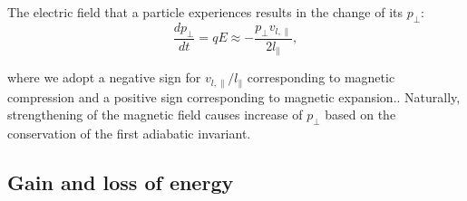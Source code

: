 \documentclass[preprint2,twocolumn,times,tighten]{aastex63}
\begin{document}
The electric field that a {particle} experiences results in the change of its $p_\perp$:
\begin{equation}
 \frac{dp_\bot}{dt} =q E \approx -\frac{p_\bot v_{l,\|}}{2l_{\|}},
\label{pper}
\end{equation}
{where we 
adopt 
{a negative sign for $v_{l,\|}/l_\|$ corresponding to magnetic compression 
and a positive sign corresponding to magnetic expansion.}. 
Naturally, strengthening of the magnetic field causes increase of $p_\perp$ based on the conservation of the first adiabatic invariant. 


\subsection{Gain and loss of energy} 





}
\end{document}
